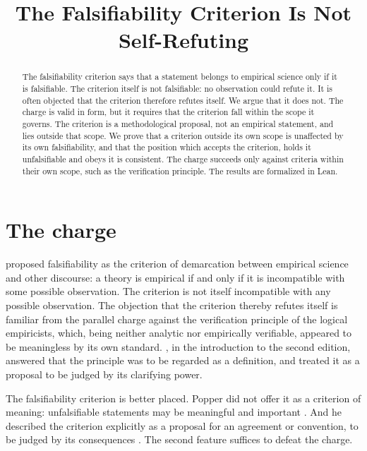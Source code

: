 \documentclass{situationist-preprint}
\title{The Falsifiability Criterion Is Not Self-Refuting}
\begin{document}
\maketitle

\begin{abstract}
The falsifiability criterion says that a statement belongs to empirical science only if it is falsifiable. The criterion itself is not falsifiable: no observation could refute it. It is often objected that the criterion therefore refutes itself. We argue that it does not. The charge is valid in form, but it requires that the criterion fall within the scope it governs. The criterion is a methodological proposal, not an empirical statement, and lies outside that scope. We prove that a criterion outside its own scope is unaffected by its own falsifiability, and that the position which accepts the criterion, holds it unfalsifiable and obeys it is consistent. The charge succeeds only against criteria within their own scope, such as the verification principle. The results are formalized in Lean.
\end{abstract}

\section{The charge}

\citet{Popper1959} proposed falsifiability as the criterion of demarcation between empirical science and other discourse: a theory is empirical if and only if it is incompatible with some possible observation. The criterion is not itself incompatible with any possible observation. The objection that the criterion thereby refutes itself is familiar from the parallel charge against the verification principle of the logical empiricists, which, being neither analytic nor empirically verifiable, appeared to be meaningless by its own standard. \citet{Ayer1936}, in the introduction to the second edition, answered that the principle was to be regarded as a definition, and \citet{Hempel1950} treated it as a proposal to be judged by its clarifying power.

The falsifiability criterion is better placed. Popper did not offer it as a criterion of meaning: unfalsifiable statements may be meaningful and important \citep[ch.~11]{Popper1963}. And he described the criterion explicitly as a proposal for an agreement or convention, to be judged by its consequences \citep[\S4]{Popper1959}. The second feature suffices to defeat the charge.
\end{document}
